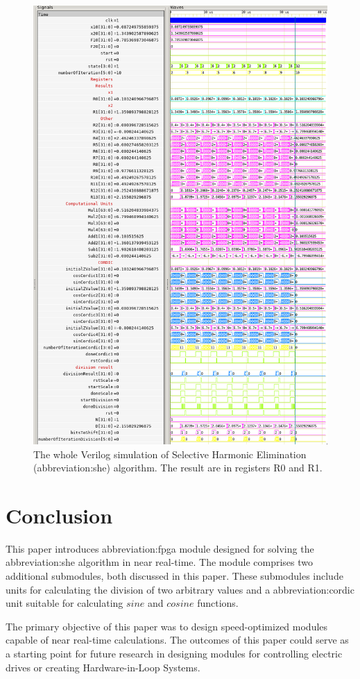 \documentclass[a4paper, twoside, 11pt]{article}
\begin{document}
            \begin{figure}[htbp!]
                \centering
                \includegraphics[width=1\textwidth]{src/png/inverted/she-sim-all.png}
                \caption{The whole Verilog simulation of Selective Harmonic Elimination (\gls{abbreviation:she}) algorithm. The result are in registers R0 and R1.}
                \label{fig:she-sim-all}
            \end{figure}
\newpage
{} 
\section*{Conclusion}
This paper introduces \gls{abbreviation:fpga} module designed for solving the \gls{abbreviation:she} algorithm in near real-time. The module comprises two additional submodules, both discussed in this paper. These submodules include units for calculating the division of two arbitrary values and a \gls{abbreviation:cordic} unit suitable for calculating $sine$ and $cosine$ functions.\par
The primary objective of this paper was to design speed-optimized modules capable of near real-time calculations. The outcomes of this paper could serve as a starting point for future research in designing modules for controlling electric drives or creating Hardware-in-Loop Systems.
\end{document}
